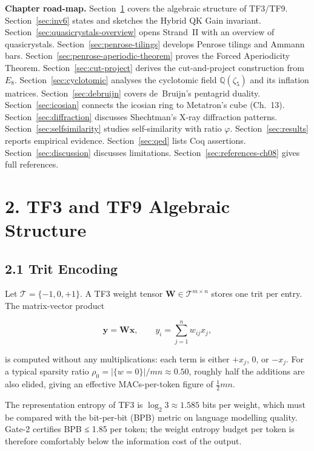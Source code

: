 \medskip
\noindent
\textbf{Chapter road-map.}
Section~\ref{sec:tf3-tf9} covers the algebraic
structure of TF3/TF9. Section~\ref{sec:inv6}
states and sketches the Hybrid QK Gain invariant.
Section~\ref{sec:quasicrystals-overview} opens
Strand~II with an overview of quasicrystals.
Section~\ref{sec:penrose-tilings} develops Penrose
tilings and Ammann bars. Section~\ref{sec:penrose-aperiodic-theorem} proves
the Forced Aperiodicity Theorem.
Section~\ref{sec:cut-project} derives the
cut-and-project construction from \(E_8\).
Section~\ref{sec:cyclotomic} analyses the
cyclotomic field \(\mathbb{Q}(\zeta_5)\) and its
inflation matrices. Section~\ref{sec:debruijn}
covers de~Bruijn's pentagrid duality.
Section~\ref{sec:icosian} connects the
icosian ring to Metatron's cube (Ch.~13).
Section~\ref{sec:diffraction} discusses
Shechtman's X-ray diffraction patterns.
Section~\ref{sec:selfsimilarity} studies
self-similarity with ratio \(\varphi\).
Section~\ref{sec:results} reports empirical evidence.
Section~\ref{sec:qed} lists Coq assertions.
Section~\ref{sec:discussion} discusses limitations.
Section~\ref{sec:references-ch08} gives full references.

\section{2. TF3 and TF9 Algebraic
Structure}\label{sec:tf3-tf9}\label{tf3-and-tf9-algebraic-structure}

\subsection{2.1 Trit
Encoding}\label{trit-encoding}

Let \(\mathcal{T} = \{-1, 0, +1\}\). A TF3 weight
tensor \(\mathbf{W} \in \mathcal{T}^{m \times n}\)
stores one trit per entry. The matrix-vector
product

\[\mathbf{y} = \mathbf{W}\mathbf{x}, \qquad y_i = \sum_{j=1}^{n} w_{ij} x_j,\]

is computed without any multiplications: each term
is either \(+x_j\), \(0\), or \(-x_j\). For a
typical sparsity ratio
\(\rho_0 = |\{w=0\}|/mn \approx 0.50\), roughly
half the additions are also elided, giving an
effective MACs-per-token figure of
\(\tfrac{1}{2} mn\).

The representation entropy of TF3 is
\(\log_2 3 \approx 1.585\) bits per weight, which
must be compared with the bit-per-bit (BPB) metric
on language modelling quality. Gate-2 certifies
BPB ≤ 1.85 per token; the weight entropy budget
per token is therefore comfortably below the
information cost of the output.

